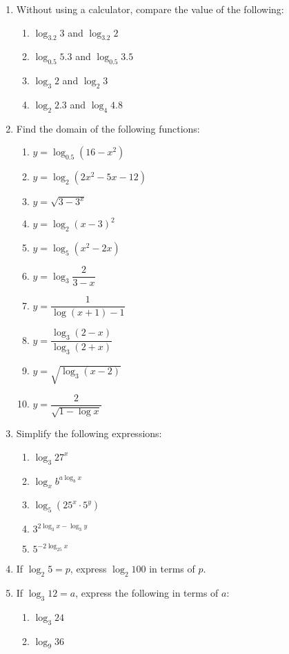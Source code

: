 \documentclass[12pt]{report}
\begin{document}
\begin{enumerate}
    \item Without using a calculator, compare the value of the following:
          \begin{enumerate}
              \item $\log_{3.2}3$ and $\log_{3.2}2$
              \item $\log_{0.5}5.3$ and $\log_{0.5}3.5$
              \item $\log_{3}2$ and $\log_{2}3$
              \item $\log_{2}2.3$ and $\log_{4}4.8$
          \end{enumerate}

    \item Find the domain of the following functions:
          \begin{enumerate}
              \item $y=\log_{0.5}\left(16-x^{2}\right)$
              \item $y=\log_{2}\left(2x^{2}-5x-12\right)$
              \item $y=\sqrt{3-3^{x}}$
              \item $y=\log_{2}{(x-3)}^{2}$
              \item $y=\log_{5}\left(x^{2}-2x\right)$
              \item $y=\log_{3}{\dfrac{2}{3-x}}$
              \item $y=\dfrac{1}{\log(x+1)-1}$
              \item $y=\dfrac{\log_3\left(2-x\right)}{\log_3\left(2+x\right)}$
              \item $y=\sqrt{\log_{3}(x-2)}$
              \item $y={\dfrac{2}{\sqrt{1-\log x}}}$
          \end{enumerate}

    \item Simplify the following expressions:
          \begin{enumerate}
              \item $\log_{3}27^{x}$
              \item $\log_{x}b^{a\log_{b}x}$
              \item $\log_{5}\left(25^{x}\cdot5^{y}\right)$
              \item $3^{2\log_{3}x - \log_{3}y}$
              \item $5^{-2\log_{25}x}$
          \end{enumerate}

    \item If $\log_2 5 = p$, express $\log_2 100$ in terms of $p$.
    \item If $\log_3 12 = a$, express the following in terms of $a$:
          \begin{enumerate}
              \item $\log_3 24$
              \item $\log_9 36$
          \end{enumerate}


\end{enumerate}
\end{document}
